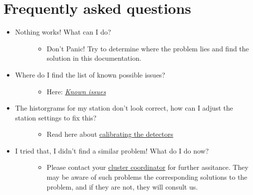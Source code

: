 \documentclass[a4paper,11pt,english]{sphinxmanual}
\begin{document}
\chapter{Frequently asked questions}
\label{faq::doc}\label{faq:frequently-asked-questions}\begin{itemize}
\item {} \begin{description}
\item[{Nothing works! What can I do?}] \leavevmode\begin{itemize}
\item {} 
Don't Panic! Try to determine where the problem lies and find the solution in this documentation.

\end{itemize}

\end{description}

\item {} \begin{description}
\item[{Where do I find the list of known possible issues?}] \leavevmode\begin{itemize}
\item {} 
Here: {\hyperref[known-issues::doc]{\emph{Known issues}}}

\end{itemize}

\end{description}

\item {} \begin{description}
\item[{The historgrams for my station don't look correct, how can I adjust the station settings to fix this?}] \leavevmode\begin{itemize}
\item {} 
Read here about \href{http://hisparc.github.com/station-software/doc/configuratie.html\#calibratie-van-de-detector}{calibrating the detectors}

\end{itemize}

\end{description}

\item {} \begin{description}
\item[{I tried that, I didn't find a similar problem! What do I do now?}] \leavevmode\begin{itemize}
\item {} 
Please contact your \href{http://www.hisparc.nl/over-hisparc/organisatie/}{cluster coordinator}  for further assitance. They may be aware of such problems the corresponding solutions to the problem, and if they are not, they will consult us.

\end{itemize}

\end{description}

\end{itemize}
\end{document}
